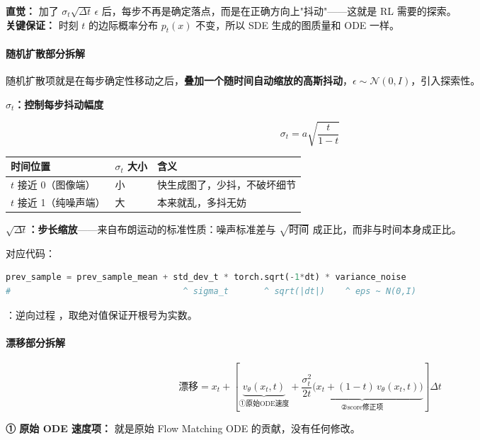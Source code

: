 \begin{intubox}
\textbf{直觉：} 加了 $\sigma_t\sqrt{\Delta t}\,\epsilon$ 后，每步不再是确定落点，而是在正确方向上"抖动"——这就是 RL 需要的探索。\\
\textbf{关键保证：} 时刻 $t$ 的边际概率分布 $p_t(x)$ 不变，所以 SDE 生成的图质量和 ODE 一样。
\end{intubox}

\paragraph{随机扩散部分拆解}

随机扩散项就是在每步确定性移动之后，\textbf{叠加一个随时间自动缩放的高斯抖动}，$\epsilon \sim \mathcal{N}(0, I)$，引入探索性。

\textbf{$\sigma_t$：控制每步抖动幅度}

\[
\sigma_t = a\sqrt{\frac{t}{1-t}}
\]

\begin{center}
\begin{tabular}{p{4cm}p{2.5cm}p{5cm}}
\hline
时间位置 & $\sigma_t$ 大小 & 含义 \\
\hline
$t$ 接近 0（图像端） & 小 & 快生成图了，少抖，不破坏细节 \\
$t$ 接近 1（纯噪声端） & 大 & 本来就乱，多抖无妨 \\
\hline
\end{tabular}
\end{center}

\textbf{$\sqrt{\Delta t}$：步长缩放}——来自布朗运动的标准性质：噪声标准差与 $\sqrt{\text{时间}}$ 成正比，而非与时间本身成正比。

对应代码：
\begin{lstlisting}[language=Python]
prev_sample = prev_sample_mean + std_dev_t * torch.sqrt(-1*dt) * variance_noise
#                                  ^ sigma_t       ^ sqrt(|dt|)    ^ eps ~ N(0,I)
\end{lstlisting}
：逆向过程 ，取绝对值保证开根号为实数。

\paragraph{漂移部分拆解}

\[
\text{漂移} = x_t + \left[\underbrace{v_\theta(x_t,t)}_{\text{①原始ODE速度}} + \underbrace{\frac{\sigma_t^2}{2t}\bigl(x_t + (1-t)\,v_\theta(x_t,t)\bigr)}_{\text{②score修正项}}\right]\Delta t
\]

\textbf{① 原始 ODE 速度项：} 就是原始 Flow Matching ODE 的贡献，没有任何修改。

